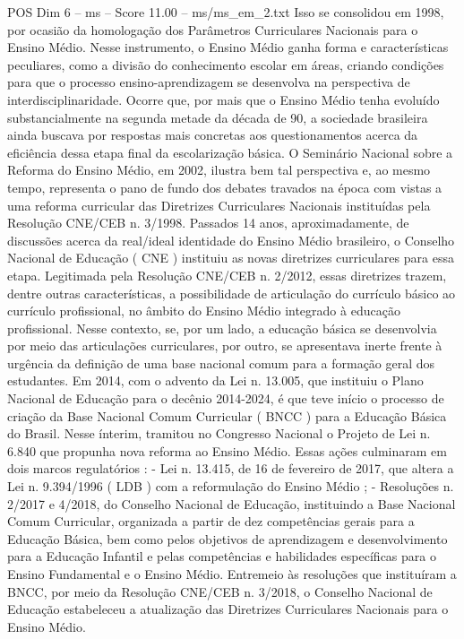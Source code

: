 \begin{textsample}{POS Dim 6 – ms – Score 11.00 – ms/ms\_em\_2.txt}
Isso se consolidou em 1998, por ocasião da homologação dos Parâmetros Curriculares Nacionais para o Ensino Médio.
Nesse instrumento, o Ensino Médio ganha forma e características peculiares, como a divisão do conhecimento escolar em áreas, criando condições para que o processo ensino-aprendizagem se desenvolva na perspectiva de interdisciplinaridade.
Ocorre que, por mais que o Ensino Médio tenha evoluído substancialmente na segunda metade da década de 90, a sociedade brasileira ainda buscava por respostas mais concretas aos questionamentos acerca da eficiência dessa etapa final da escolarização básica.
O Seminário Nacional sobre a Reforma do Ensino Médio, em 2002, ilustra bem tal perspectiva e, ao mesmo tempo, representa o pano de fundo dos debates travados na época com vistas a uma reforma curricular das Diretrizes Curriculares Nacionais instituídas pela Resolução CNE/CEB n. 3/1998.
Passados 14 anos, aproximadamente, de discussões acerca da real/ideal identidade do Ensino Médio brasileiro, o Conselho Nacional de Educação ( CNE ) instituiu as novas diretrizes curriculares para essa etapa.
Legitimada pela Resolução CNE/CEB n. 2/2012, essas diretrizes trazem, dentre outras características, a possibilidade de articulação do currículo básico ao currículo profissional, no âmbito do Ensino Médio integrado à educação profissional.
Nesse contexto, se, por um lado, a educação básica se desenvolvia por meio das articulações curriculares, por outro, se apresentava inerte frente à urgência da definição de uma base nacional comum para a formação geral dos estudantes.
Em 2014, com o advento da Lei n. 13.005, que instituiu o Plano Nacional de Educação para o decênio 2014-2024, é que teve início o processo de criação da Base Nacional Comum Curricular ( BNCC ) para a Educação Básica do Brasil.
Nesse ínterim, tramitou no Congresso Nacional o Projeto de Lei n. 6.840 que propunha nova reforma ao Ensino Médio.
Essas ações culminaram em dois marcos regulatórios : - Lei n. 13.415, de 16 de fevereiro de 2017, que altera a Lei n. 9.394/1996 ( LDB ) com a reformulação do Ensino Médio ; - Resoluções n. 2/2017 e 4/2018, do Conselho Nacional de Educação, instituindo a Base Nacional Comum Curricular, organizada a partir de dez competências gerais para a Educação Básica, bem como pelos objetivos de aprendizagem e desenvolvimento para a Educação Infantil e pelas competências e habilidades específicas para o Ensino Fundamental e o Ensino Médio.
Entremeio às resoluções que instituíram a BNCC, por meio da Resolução CNE/CEB n. 3/2018, o Conselho Nacional de Educação estabeleceu a atualização das Diretrizes Curriculares Nacionais para o Ensino Médio.

\end{textsample}
